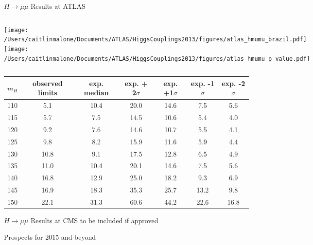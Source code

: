\documentclass{beamer}
\begin{document}
\begin{frame}{$H\rightarrow\mu\mu$ Results at ATLAS}
	\begin{columns}
		\column{2.5in}
			\texttt{[image: /Users/caitlinmalone/Documents/ATLAS/HiggsCouplings2013/figures/atlas\_hmumu\_brazil.pdf]}
		\column{2.5in}
			\texttt{[image: /Users/caitlinmalone/Documents/ATLAS/HiggsCouplings2013/figures/atlas\_hmumu\_p\_value.pdf]}			
	\end{columns}
	
	\begin{table}
	\scriptsize
	\begin{tabular}{c | c | c | c | c | c | c } 
	\hline 
	$m_H$ & observed limits & exp. median & exp. + 2$\sigma$ & exp. +1$\sigma$ & exp. -1$\sigma$ & exp. -2$\sigma$ \\ \hline
	110 & 5.1 & 10.4 & 20.0 & 14.6 & 7.5 & 5.6 \\
	115 & 5.7 & 7.5 & 14.5 & 10.6 & 5.4 & 4.0 \\
	120 & 9.2 & 7.6 & 14.6 & 10.7 & 5.5 & 4.1 \\
	125 & 9.8 & 8.2 & 15.9 & 11.6 & 5.9 & 4.4 \\
	130 & 10.8 & 9.1 & 17.5 & 12.8 & 6.5 & 4.9 \\
	135 & 11.0 & 10.4 & 20.1 & 14.6 & 7.5 & 5.6 \\
	140 & 16.8 & 12.9 & 25.0 & 18.2 & 9.3 & 6.9 \\
	145 & 16.9 & 18.3 & 35.3 & 25.7 & 13.2 & 9.8 \\
	150 & 22.1 & 31.3 & 60.6 & 44.2 & 22.6 & 16.8 \\ \hline
	\end{tabular}
	\end{table}
\end{frame}


\begin{frame}{$H\rightarrow\mu\mu$ Results at CMS}
to be included if approved
\end{frame}



\begin{frame}{Prospects for 2015 and beyond}

\end{frame}
\end{document}

